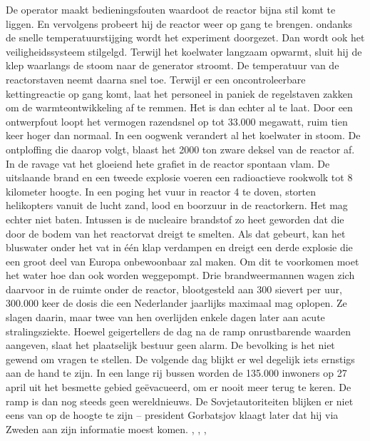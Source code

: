 De operator maakt bedieningsfouten waardoot de reactor bijna stil komt te liggen. En vervolgens probeert hij de reactor weer op gang te brengen. ondanks de snelle temperatuurstijging wordt het experiment doorgezet. Dan wordt ook het veiligheidssysteem stilgelgd. Terwijl het koelwater langzaam opwarmt, sluit hij de klep waarlangs de stoom naar de generator stroomt.
De temperatuur van de reactorstaven neemt daarna snel toe. Terwijl er een oncontroleerbare kettingreactie op gang komt, laat het personeel in paniek de regelstaven zakken om de warmteontwikkeling af te remmen. Het is dan echter al te laat. Door een ontwerpfout loopt het vermogen razendsnel op tot 33.000 megawatt, ruim tien keer hoger dan normaal.
In een oogwenk verandert al het koelwater in stoom. De ontploffing die daarop volgt, blaast het 2000 ton zware deksel van de reactor af.
In de ravage vat het gloeiend hete grafiet in de reactor spontaan vlam. De uitslaande brand en een tweede explosie voeren een radioactieve rookwolk tot 8 kilometer hoogte. 
In een poging het vuur in reactor 4 te doven, storten helikopters vanuit de lucht zand, lood en boorzuur in de reactorkern. Het mag echter niet baten.
Intussen is de nucleaire brandstof zo heet geworden dat die door de bodem van het reactorvat dreigt te smelten. Als dat gebeurt, kan het bluswater onder het vat in één klap verdampen en dreigt een derde explosie die een groot deel van Europa onbewoonbaar zal maken. Om dit te voorkomen moet het water hoe dan ook worden weggepompt.
Drie brandweermannen wagen zich daarvoor in de ruimte onder de reactor, blootgesteld aan 300 sievert per uur, 300.000 keer de dosis die een Nederlander jaarlijks maximaal mag oplopen. Ze slagen daarin, maar twee van hen overlijden enkele dagen later aan acute stralingsziekte.
Hoewel geigertellers de dag na de ramp onrustbarende waarden aangeven, slaat het plaatselijk bestuur geen alarm. De bevolking is het niet gewend om vragen te stellen.
De volgende dag blijkt er wel degelijk iets ernstigs aan de hand te zijn. In een lange rij bussen worden de 135.000 inwoners op 27 april uit het besmette gebied geëvacueerd, om er nooit meer terug te keren.
De ramp is dan nog steeds geen wereldnieuws. De Sovjetautoriteiten blijken er niet eens van op de hoogte te zijn – president Gorbatsjov klaagt later dat hij via Zweden aan zijn informatie moest komen.
\cite{verschuur14012013tjernobylreports}
\cite{paperlessarchivesTjernobyl}
\cite{vargos082000tjernobylconcerns}
\cite{mauroNuclearRiskSociety}
\cite{vienna06092005LookingBack}
\cite{wikiTjernobyl},
\cite{rivmTjernobyl},
\cite{andereTijdenTjernobyl},
